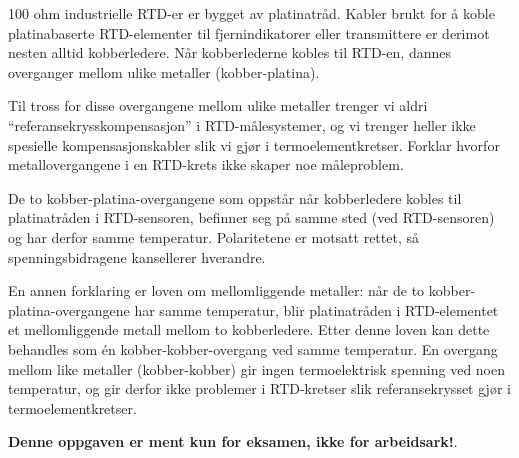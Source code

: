 

100 ohm industrielle RTD-er er bygget av platinatråd. Kabler brukt for å koble platinabaserte RTD-elementer til fjernindikatorer eller transmittere er derimot nesten alltid kobberledere. Når kobberlederne kobles til RTD-en, dannes overganger mellom ulike metaller (kobber-platina).

\vskip 10pt

Til tross for disse overgangene mellom ulike metaller trenger vi aldri ``referansekrysskompensasjon'' i RTD-målesystemer, og vi trenger heller ikke spesielle kompensasjonskabler slik vi gjør i termoelementkretser. Forklar hvorfor metallovergangene i en RTD-krets ikke skaper noe måleproblem.







De to kobber-platina-overgangene som oppstår når kobberledere kobles til platinatråden i RTD-sensoren, befinner seg på samme sted (ved RTD-sensoren) og har derfor samme temperatur. Polaritetene er motsatt rettet, så spenningsbidragene kansellerer hverandre.

\vskip 10pt

En annen forklaring er loven om mellomliggende metaller: når de to kobber-platina-overgangene har samme temperatur, blir platinatråden i RTD-elementet et mellomliggende metall mellom to kobberledere. Etter denne loven kan dette behandles som én kobber-kobber-overgang ved samme temperatur. En overgang mellom like metaller (kobber-kobber) gir ingen termoelektrisk spenning ved noen temperatur, og gir derfor ikke problemer i RTD-kretser slik referansekrysset gjør i termoelementkretser.







{\bf Denne oppgaven er ment kun for eksamen, ikke for arbeidsark!}.

